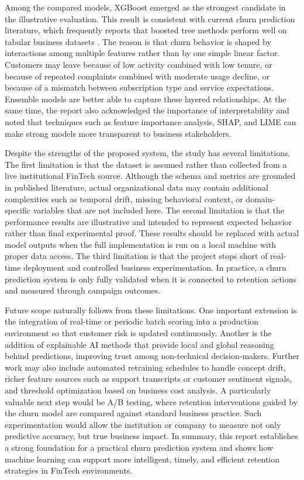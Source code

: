 Among the compared models, XGBoost emerged as the strongest candidate in the illustrative evaluation. This result is consistent with current churn prediction literature, which frequently reports that boosted tree methods perform well on tabular business datasets \cite{imani2024,bhattacharjee2026}. The reason is that churn behavior is shaped by interactions among multiple features rather than by one simple linear factor. Customers may leave because of low activity combined with low tenure, or because of repeated complaints combined with moderate usage decline, or because of a mismatch between subscription type and service expectations. Ensemble models are better able to capture these layered relationships. At the same time, the report also acknowledged the importance of interpretability and noted that techniques such as feature importance analysis, SHAP, and LIME can make strong models more transparent to business stakeholders.

Despite the strengths of the proposed system, the study has several limitations. The first limitation is that the dataset is assumed rather than collected from a live institutional FinTech source. Although the schema and metrics are grounded in published literature, actual organizational data may contain additional complexities such as temporal drift, missing behavioral context, or domain-specific variables that are not included here. The second limitation is that the performance results are illustrative and intended to represent expected behavior rather than final experimental proof. These results should be replaced with actual model outputs when the full implementation is run on a local machine with proper data access. The third limitation is that the project stops short of real-time deployment and controlled business experimentation. In practice, a churn prediction system is only fully validated when it is connected to retention actions and measured through campaign outcomes.

Future scope naturally follows from these limitations. One important extension is the integration of real-time or periodic batch scoring into a production environment so that customer risk is updated continuously. Another is the addition of explainable AI methods that provide local and global reasoning behind predictions, improving trust among non-technical decision-makers. Further work may also include automated retraining schedules to handle concept drift, richer feature sources such as support transcripts or customer sentiment signals, and threshold optimization based on business cost analysis. A particularly valuable next step would be A/B testing, where retention interventions guided by the churn model are compared against standard business practice. Such experimentation would allow the institution or company to measure not only predictive accuracy, but true business impact. In summary, this report establishes a strong foundation for a practical churn prediction system and shows how machine learning can support more intelligent, timely, and efficient retention strategies in FinTech environments.
